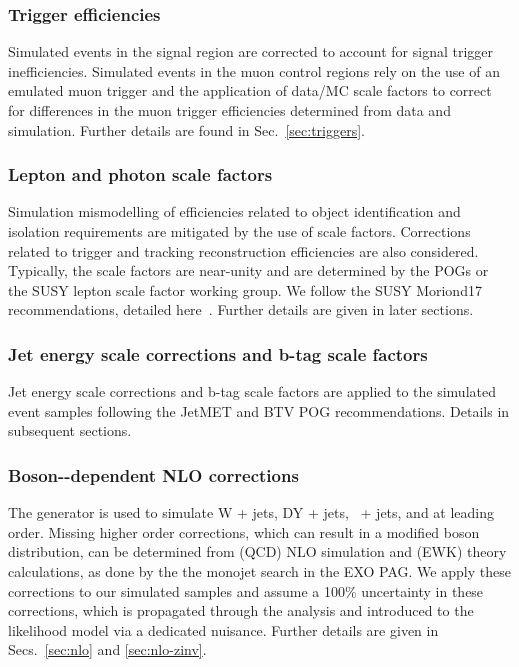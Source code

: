 \subsubsection{Trigger efficiencies}
\label{sec:trigger-sf}

Simulated events in the signal region are corrected to account for
signal trigger inefficiencies. Simulated events in the muon control
regions rely on the use of an emulated muon trigger and the
application of data/MC scale factors to correct for differences in the
muon trigger efficiencies determined from data and simulation. Further
details are found in Sec.~\ref{sec:triggers}.

\subsubsection{Lepton and photon scale factors}

Simulation mismodelling of efficiencies related to object
identification and isolation requirements are mitigated by the use of
scale factors. Corrections related to trigger and tracking
reconstruction efficiencies are also considered. Typically, the scale
factors are near-unity and are determined by the POGs or the SUSY
lepton scale factor working group. We follow the SUSY Moriond17
recommendations, detailed here~\cite{susymoriond}. Further details are
given in later sections.

\subsubsection{Jet energy scale corrections and b-tag scale factors}
\label{sec:jecs-and-btag-sf}

Jet energy scale corrections and b-tag scale factors are applied to
the simulated event samples following the JetMET and BTV POG
recommendations. Details in subsequent sections. 

\subsubsection{Boson-\texorpdfstring{\Pt}{pT}-dependent NLO corrections}
\label{sec:nlo-intro}

The \MADGRAPH generator is used to simulate W + jets, DY + jets,
\znunu\ + jets, and \gj at leading order. Missing higher order
corrections, which can result in a modified boson \Pt distribution,
can be determined from (QCD) NLO simulation and (EWK) theory
calculations, as done by the the monojet search in the EXO PAG. We
apply these corrections to our simulated samples and assume a 100\%
uncertainty in these corrections, which is propagated through the
analysis and introduced to the likelihood model via a dedicated
nuisance. Further details are given in Secs.~\ref{sec:nlo} and
\ref{sec:nlo-zinv}.

